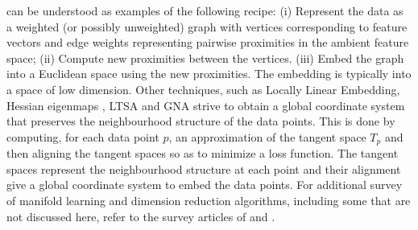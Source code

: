 \citep{coifman06:_diffus_maps} can be understood as examples of the
following recipe: (i) Represent the data as a weighted (or possibly
unweighted) graph with vertices corresponding to feature vectors and
edge weights representing pairwise proximities in the ambient feature
space; (ii) Compute new proximities between the vertices. (iii) Embed
the graph into a Euclidean space using the new proximities. The
embedding is typically into a space of low dimension. Other
techniques, such as Locally Linear Embedding, Hessian eigenmaps
\citep{donoho03:_hesian}, LTSA
\citep{zhang03:_intel_data_engin_autom_learn} and GNA
\citep{brand05:_from} strive to obtain a global coordinate system that
preserves the neighbourhood structure of the data points. This is done
by computing, for each data point $p$, an approximation of the tangent
space $T_p$ and then aligning the tangent spaces so as to minimize a
loss function. The tangent spaces represent the neighbourhood
structure at each point and their alignment give a global coordinate
system to embed the data points. For additional survey of manifold
learning and dimension reduction algorithms, including some that
are not discussed here, refer to the survey articles of
\citet{burges05:_data} and
\citet{saul06:_semis}. 

